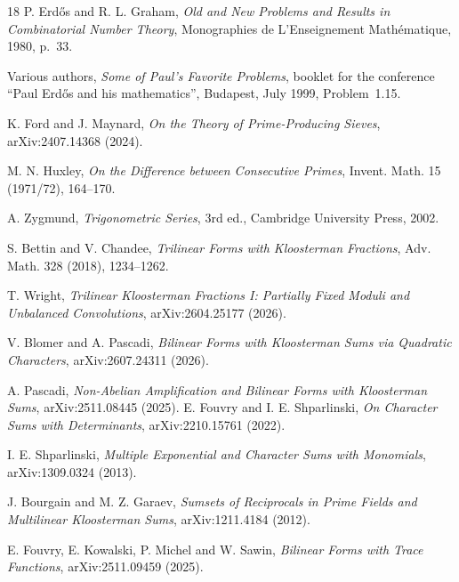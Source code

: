 \documentclass[11pt]{article}
\theoremstyle{definition}
\theoremstyle{remark}
\newcommand{\1}{\mathbf 1}
\begin{document}
\begin{thebibliography}{18}
P. Erd\H{o}s and R. L. Graham,
\emph{Old and New Problems and Results in Combinatorial Number Theory},
Monographies de L'Enseignement Math\'ematique, 1980, p.~33.

Various authors,
\emph{Some of Paul's Favorite Problems},
booklet for the conference ``Paul Erd\H{o}s and his mathematics'', Budapest, July 1999, Problem~1.15.

K. Ford and J. Maynard,
\emph{On the Theory of Prime-Producing Sieves}, arXiv:2407.14368 (2024).

M. N. Huxley,
\emph{On the Difference between Consecutive Primes}, Invent. Math. 15 (1971/72), 164--170.

A. Zygmund, \emph{Trigonometric Series}, 3rd ed., Cambridge University Press, 2002.

S. Bettin and V. Chandee,
\emph{Trilinear Forms with Kloosterman Fractions}, Adv. Math. 328 (2018), 1234--1262.

T. Wright,
\emph{Trilinear Kloosterman Fractions I: Partially Fixed Moduli and Unbalanced Convolutions},
arXiv:2604.25177 (2026).

V. Blomer and A. Pascadi,
\emph{Bilinear Forms with Kloosterman Sums via Quadratic Characters},
arXiv:2607.24311 (2026).

A. Pascadi,
\emph{Non-Abelian Amplification and Bilinear Forms with Kloosterman Sums},
arXiv:2511.08445 (2025).
E. Fouvry and I. E. Shparlinski,
\emph{On Character Sums with Determinants}, arXiv:2210.15761 (2022).

I. E. Shparlinski,
\emph{Multiple Exponential and Character Sums with Monomials}, arXiv:1309.0324 (2013).

J. Bourgain and M. Z. Garaev,
\emph{Sumsets of Reciprocals in Prime Fields and Multilinear Kloosterman Sums}, arXiv:1211.4184 (2012).

E. Fouvry, E. Kowalski, P. Michel and W. Sawin,
\emph{Bilinear Forms with Trace Functions}, arXiv:2511.09459 (2025).
\end{thebibliography}
\end{document}

